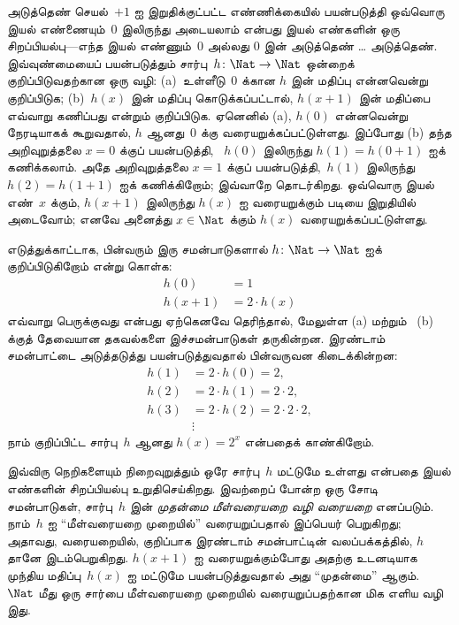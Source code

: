 \documentclass[../../../include/open-logic-section]{subfiles}
\begin{document}


அடுத்தெண் செயல்~$+1$ ஐ இறுதிக்குட்பட்ட எண்ணிக்கையில் பயன்படுத்தி
ஒவ்வொரு இயல் எண்ணையும்~$0$ இலிருந்து அடையலாம் என்பது இயல் எண்களின்
ஒரு சிறப்பியல்பு---எந்த இயல் எண்ணும்~$0$ அல்லது $0$ இன் அடுத்தெண்
\dots{} அடுத்தெண். இவ்வுண்மையைப் பயன்படுத்தும்
சார்பு~$h\colon\Nat \to \Nat$ ஒன்றைக் குறிப்பிடுவதற்கான ஒரு வழி:
(a)~உள்ளீடு~$0$ க்கான $h$ இன் மதிப்பு என்னவென்று குறிப்பிடுக;
(b)~$h(x)$ இன் மதிப்பு கொடுக்கப்பட்டால், $h(x+1)$ இன் மதிப்பை
எவ்வாறு கணிப்பது என்றும் குறிப்பிடுக. ஏனெனில் (a), $h(0)$ என்னவென்று
நேரடியாகக் கூறுவதால், $h$ ஆனது~$0$ க்கு வரையறுக்கப்பட்டுள்ளது.
இப்போது (b) தந்த அறிவுறுத்தலை $x=0$ க்குப் பயன்படுத்தி,
~$h(0)$ இலிருந்து $h(1) = h(0+1)$ ஐக் கணிக்கலாம். அதே
அறிவுறுத்தலை $x=1$ க்குப் பயன்படுத்தி,~$h(1)$ இலிருந்து
$h(2) = h(1+1)$ ஐக் கணிக்கிறோம்; இவ்வாறே தொடர்கிறது. ஒவ்வொரு
இயல் எண்~$x$ க்கும், $h(x+1)$ இலிருந்து $h(x)$ ஐ வரையறுக்கும்
படியை இறுதியில் அடைவோம்; எனவே அனைத்து $x \in \Nat$ க்கும்
$h(x)$ வரையறுக்கப்பட்டுள்ளது.

எடுத்துக்காட்டாக, பின்வரும் இரு சமன்பாடுகளால்
$h\colon \Nat \to \Nat$ ஐக் குறிப்பிடுகிறோம் என்று கொள்க:
\begin{align*}
h(0) & =  1\\
h(x+1) & =  2 \cdot h(x)
\end{align*}
எவ்வாறு பெருக்குவது என்பது ஏற்கெனவே தெரிந்தால், மேலுள்ள (a) மற்றும்
~(b) க்குத் தேவையான தகவல்களை இச்சமன்பாடுகள் தருகின்றன. இரண்டாம்
சமன்பாட்டை அடுத்தடுத்து பயன்படுத்துவதால் பின்வருவன கிடைக்கின்றன:
\begin{align*}
  h(1) & = 2\cdot h(0) = 2,\\
  h(2) & = 2\cdot h(1) = 2\cdot 2,\\
  h(3) & = 2 \cdot h(2) = 2\cdot 2 \cdot 2,\\
  & \vdots
\end{align*}
நாம் குறிப்பிட்ட சார்பு~$h$ ஆனது $h(x) = 2^x$ என்பதைக் காண்கிறோம்.

இவ்விரு நெறிகளையும் நிறைவுறுத்தும் ஒரே சார்பு~$h$ மட்டுமே உள்ளது
என்பதை இயல் எண்களின் சிறப்பியல்பு உறுதிசெய்கிறது. இவற்றைப் போன்ற
ஒரு சோடி சமன்பாடுகள், சார்பு~$h$ இன்
\emph{முதன்மை மீள்வரையறை வழி வரையறை} எனப்படும். நாம்~$h$ ஐ
“மீள்வரையறை முறையில்” வரையறுப்பதால் இப்பெயர் பெறுகிறது; அதாவது,
வரையறையில், குறிப்பாக இரண்டாம் சமன்பாட்டின் வலப்பக்கத்தில்,
$h$ தானே இடம்பெறுகிறது. $h(x+1)$ ஐ வரையறுக்கும்போது அதற்கு
உடனடியாக முந்திய மதிப்பு~$h(x)$ ஐ மட்டுமே பயன்படுத்துவதால் அது
“முதன்மை” ஆகும். ~$\Nat$ மீது ஒரு சார்பை மீள்வரையறை முறையில்
வரையறுப்பதற்கான மிக எளிய வழி இது.
\end{document}
